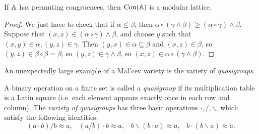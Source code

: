 \documentclass[letterpaper,11pt]{article}
\DeclareMathOperator{\Con}{Con}
\begin{document}
\begin{center}
\end{center}

\begin{prop} If $\mathbb{A}$ has permuting congruences, then $\Con(\bA)$ is a modular lattice.
\end{prop}
\begin{proof} We just have to check that if $\alpha \le \beta$, then $\alpha \circ (\gamma \wedge \beta) \ge (\alpha \circ \gamma) \wedge \beta$. Suppose that $(x,z) \in (\alpha \circ \gamma) \wedge \beta$, and choose $y$ such that $(x,y) \in \alpha, (y,z) \in \gamma$. Then $(y,x) \in \alpha \subseteq \beta$ and $(x,z) \in \beta$, so $(y,z) \in \beta \circ \beta = \beta$, so $(y,z) \in \gamma\wedge \beta$, so $(x,z) \in \alpha \circ (\gamma \wedge \beta)$.
\end{proof}


An unexpectedly large example of a Mal'cev variety is the variety of \emph{quasigroups}.

\begin{defn} A binary operation on a finite set is called a \emph{quasigroup} if its multiplication table is a Latin square (i.e. each element appears exactly once in each row and column). The \emph{variety of quasigroups} has three basic operations $\cdot, /, \backslash$, which satisfy the following identities:
\[
(a\cdot b)/b \approx a, \;\;\; (a/b)\cdot b \approx a, \;\;\; b\backslash(b\cdot a) \approx a, \;\;\; b\cdot (b\backslash a) \approx a.
\]
\end{defn}
\end{document}
